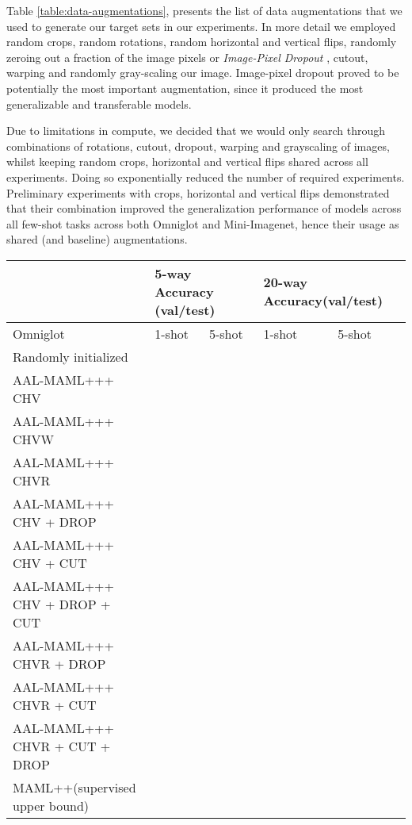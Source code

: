 \documentclass{article}
\newcommand{\umaml}{AAL-MAML++}
\newcommand{\maml}{MAML++}
\begin{document}
Table \ref{table:data-augmentations}, presents the list of data augmentations that we used to generate our target sets in our experiments. In more detail we employed random crops, random rotations, random horizontal and vertical flips, randomly zeroing out a fraction of the image pixels or \emph{Image-Pixel Dropout} \cite{krizhevsky2012imagenet}, cutout, warping and randomly gray-scaling our image. Image-pixel dropout proved to be potentially the most important augmentation, since it produced the most generalizable and transferable models. 

Due to limitations in compute, we decided that we would only search through combinations of rotations, cutout, dropout, warping and grayscaling of images, whilst keeping random crops, horizontal and vertical flips shared across all experiments. Doing so exponentially reduced the number of required experiments. Preliminary experiments with crops, horizontal and vertical flips demonstrated that their combination improved the generalization performance of models across all few-shot tasks across both Omniglot and Mini-Imagenet, hence their usage as shared (and baseline) augmentations.

\begin{table*}[!htb]
\begin{center}
\begin{tabular}{|l|l|l|l|l|}
\hline
                              & \multicolumn{2}{l|}{5-way Accuracy (val/test)}        & \multicolumn{2}{l|}{20-way Accuracy(val/test) } \\ \hline
Omniglot                                  & 1-shot             & 5-shot            & 1-shot             & 5-shot                   \\ \hline
Randomly initialized                      &   &  &   &\\\hline
\umaml + CHV                              &   &  &   &\\\hline
\umaml + CHVW                             &   &  &   &\\\hline
\umaml + CHVR                             &   &  &   &\\\hline
\umaml + CHV + DROP                       &   &  &   &\\\hline
\umaml + CHV + CUT                        &   &  &   &\\\hline
\umaml + CHV + DROP + CUT                 &   &  &   &\\\hline
\umaml + CHVR + DROP                      &  &  &   &\\\hline
\umaml + CHVR + CUT                       &   &  &   &\\\hline
\umaml + CHVR + CUT + DROP                &   &  &   &\\\hline
\maml (supervised upper bound)            &   &  &   &\\\hline


\end{tabular}
\end{center}
\vspace{-4mm}
\caption{\umaml\ Omniglot Ablation studies}
\label{table:umaml-ablation-omniglot}
\end{table*}
\end{document}
